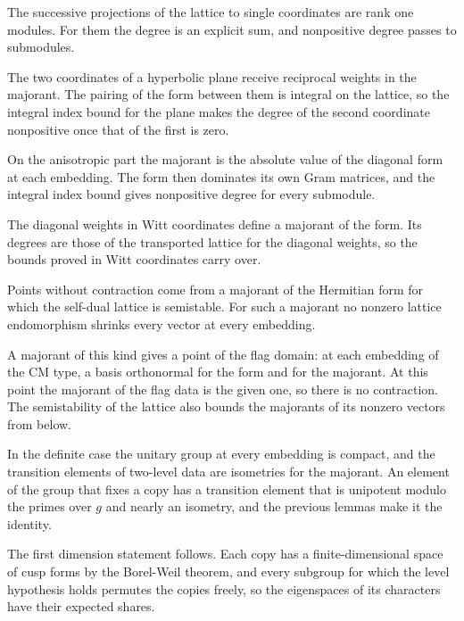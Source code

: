The successive projections of the lattice to single coordinates are rank one modules. For them the
degree is an explicit sum, and nonpositive degree passes to submodules.

The two coordinates of a hyperbolic plane receive reciprocal weights in the majorant. The pairing of
the form between them is integral on the lattice, so the integral index bound for the plane makes the
degree of the second coordinate nonpositive once that of the first is zero.

On the anisotropic part the majorant is the absolute value of the diagonal form at each embedding. The
form then dominates its own Gram matrices, and the integral index bound gives nonpositive degree for
every submodule.

The diagonal weights in Witt coordinates define a majorant of the form. Its degrees are those of the
transported lattice for the diagonal weights, so the bounds proved in Witt coordinates carry over.

Points without contraction come from a majorant of the Hermitian form for which the self-dual lattice
is semistable. For such a majorant no nonzero lattice endomorphism shrinks every vector at every
embedding.

A majorant of this kind gives a point of the flag domain: at each embedding of the CM type, a basis
orthonormal for the form and for the majorant. At this point the majorant of the flag data is the
given one, so there is no contraction. The semistability of the lattice also bounds the majorants of
its nonzero vectors from below.

In the definite case the unitary group at every embedding is compact, and the transition elements of
two-level data are isometries for the majorant. An element of the group that fixes a copy has a
transition element that is unipotent modulo the primes over $g$ and nearly an isometry, and the
previous lemmas make it the identity.

The first dimension statement follows. Each copy has a finite-dimensional space of cusp forms by the
Borel-Weil theorem, and every subgroup for which the level hypothesis holds permutes the copies
freely, so the eigenspaces of its characters have their expected shares.

